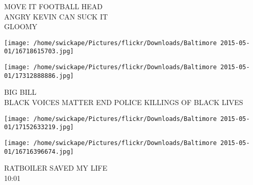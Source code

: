 \documentclass[10pt,letterpaper]{article}
\begin{document}
MOVE IT FOOTBALL HEAD\\
ANGRY KEVIN CAN SUCK IT\\
GLOOMY
\pagebreak

\texttt{[image: /home/swickape/Pictures/flickr/Downloads/Baltimore 2015-05-01/16718615703.jpg]}

\vspace{0.25in}
\texttt{[image: /home/swickape/Pictures/flickr/Downloads/Baltimore 2015-05-01/17312888886.jpg]}

BIG BILL\\
BLACK VOICES MATTER END POLICE KILLINGS OF BLACK LIVES
\pagebreak

\texttt{[image: /home/swickape/Pictures/flickr/Downloads/Baltimore 2015-05-01/17152633219.jpg]}

\vspace{0.25in}
\texttt{[image: /home/swickape/Pictures/flickr/Downloads/Baltimore 2015-05-01/16716396674.jpg]}

RATBOILER SAVED MY LIFE\\
10:01
\pagebreak
\end{document}
